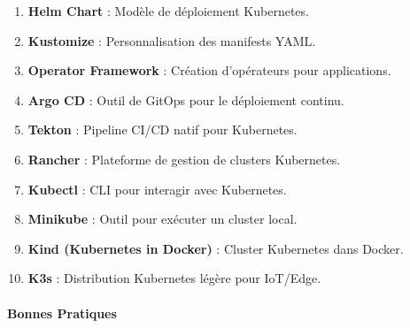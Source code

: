 \documentclass[
  letterpaper,
  DIV=11,
  numbers=noendperiod]{scrartcl}
\makeatletter
\let\oldparagraph\paragraph
\renewcommand{\paragraph}{
    \@ifstar
      \xxxParagraphStar
      \xxxParagraphNoStar
  }
\newcommand{\xxxParagraphStar}[1]{\oldparagraph*{#1}\mbox{}}
\newcommand{\xxxParagraphNoStar}[1]{\oldparagraph{#1}\mbox{}}
\providecommand{\tightlist}{%
  \setlength{\itemsep}{0pt}\setlength{\parskip}{0pt}}\usepackage{longtable,booktabs,array}
\makeatother
\begin{document}
\begin{enumerate}
\def\labelenumi{\arabic{enumi}.}
\setcounter{enumi}{70}
\tightlist
\item
  \textbf{Helm Chart} : Modèle de déploiement Kubernetes.\\
\item
  \textbf{Kustomize} : Personnalisation des manifests YAML.\\
\item
  \textbf{Operator Framework} : Création d'opérateurs pour
  applications.\\
\item
  \textbf{Argo CD} : Outil de GitOps pour le déploiement continu.\\
\item
  \textbf{Tekton} : Pipeline CI/CD natif pour Kubernetes.\\
\item
  \textbf{Rancher} : Plateforme de gestion de clusters Kubernetes.\\
\item
  \textbf{Kubectl} : CLI pour interagir avec Kubernetes.\\
\item
  \textbf{Minikube} : Outil pour exécuter un cluster local.\\
\item
  \textbf{Kind (Kubernetes in Docker)} : Cluster Kubernetes dans
  Docker.\\
\item
  \textbf{K3s} : Distribution Kubernetes légère pour IoT/Edge.
\end{enumerate}

\paragraph{\texorpdfstring{\textbf{Bonnes
Pratiques}}{Bonnes Pratiques}}\label{bonnes-pratiques-2}
\end{document}
